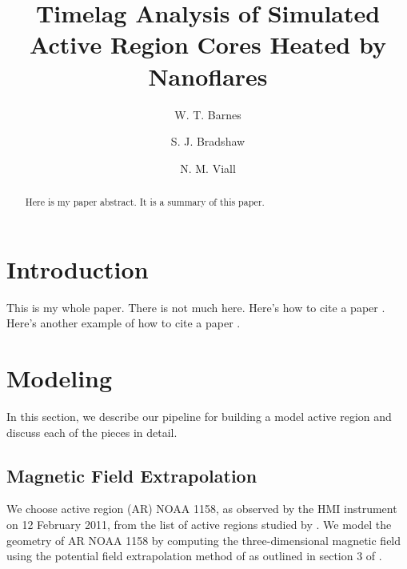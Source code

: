 \documentclass[modern,linenumbers]{aastex62}
\begin{document}
\title{Timelag Analysis of Simulated Active Region Cores Heated by Nanoflares}

\author[0000-0001-9642-6089]{W. T. Barnes}
\author{S. J. Bradshaw}
\author{N. M. Viall}

\begin{abstract}
Here is my paper abstract. It is a summary of this paper.
\end{abstract}



\section{Introduction}\label{introduction}

This is my whole paper. There is not much here. Here's how to cite a
paper \citet{viall_evidence_2012}. Here's another example of how to cite
a paper \citep{warren_constraints_2011}.


\section{Modeling}
\label{modeling}
In this section, we describe our pipeline for building a model active region and discuss each of the pieces in detail.

\subsection{Magnetic Field Extrapolation}
\label{field}

We choose active region (AR) NOAA 1158, as observed by the HMI instrument \citet{hoeksema_helioseismic_2014} on 12 February 2011, from the list of active regions studied by \citet{warren_systematic_2012}. We model the geometry of AR NOAA 1158 by computing the three-dimensional magnetic field using the potential field extrapolation method of \citet{schmidt_observable_1964} as outlined in section 3 of \citet{sakurai_greens_1982}. 
\end{document}
